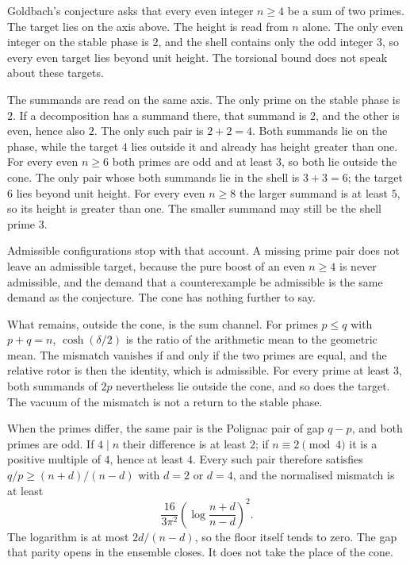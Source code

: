 \documentclass[a4paper]{article}
\theoremstyle{definition}
\theoremstyle{remark}
\begin{document}
Goldbach's conjecture asks that every even integer \(n\ge 4\) be a sum of two primes. The target lies on the axis above. The height is read from \(n\) alone. The only even integer on the stable phase is \(2\), and the shell contains only the odd integer \(3\), so every even target lies beyond unit height. The torsional bound does not speak about these targets.

The summands are read on the same axis. The only prime on the stable phase is \(2\). If a decomposition has a summand there, that summand is \(2\), and the other is even, hence also \(2\). The only such pair is \(2+2=4\). Both summands lie on the phase, while the target \(4\) lies outside it and already has height greater than one. For every even \(n\ge 6\) both primes are odd and at least \(3\), so both lie outside the cone. The only pair whose both summands lie in the shell is \(3+3=6\); the target \(6\) lies beyond unit height. For every even \(n\ge 8\) the larger summand is at least \(5\), so its height is greater than one. The smaller summand may still be the shell prime \(3\).

Admissible configurations stop with that account. A missing prime pair does not leave an admissible target, because the pure boost of an even \(n\ge 4\) is never admissible, and the demand that a counterexample be admissible is the same demand as the conjecture. The cone has nothing further to say.

What remains, outside the cone, is the sum channel. For primes \(p\le q\) with \(p+q=n\), \(\cosh(\delta/2)\) is the ratio of the arithmetic mean to the geometric mean. The mismatch vanishes if and only if the two primes are equal, and the relative rotor is then the identity, which is admissible. For every prime at least \(3\), both summands of \(2p\) nevertheless lie outside the cone, and so does the target. The vacuum of the mismatch is not a return to the stable phase.

When the primes differ, the same pair is the Polignac pair of gap \(q-p\), and both primes are odd. If \(4\mid n\) their difference is at least \(2\); if \(n\equiv 2\pmod 4\) it is a positive multiple of \(4\), hence at least \(4\). Every such pair therefore satisfies \(q/p\ge(n+d)/(n-d)\) with \(d=2\) or \(d=4\), and the normalised mismatch is at least
\[
\frac{16}{3\pi^2}\left(\log\frac{n+d}{n-d}\right)^2.
\]
The logarithm is at most \(2d/(n-d)\), so the floor itself tends to zero. The gap that parity opens in the ensemble closes. It does not take the place of the cone.
\end{document}
